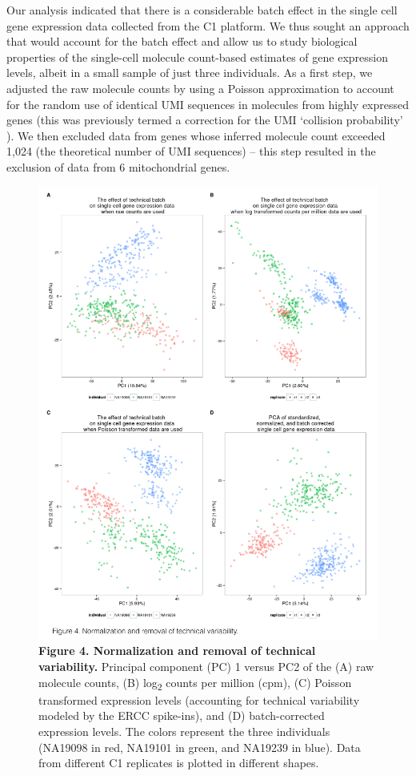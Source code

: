 Our analysis indicated that there is a considerable batch effect in the
single cell gene expression data collected from the C1 platform. We thus
sought an approach that would account for the batch effect and allow us
to study biological properties of the single-cell molecule count-based
estimates of gene expression levels, albeit in a small sample of just
three individuals. As a first step, we adjusted the raw molecule counts
by using a Poisson approximation to account for the random use of
identical UMI sequences in molecules from highly expressed genes (this
was previously termed a correction for the UMI `collision probability'
\citep{Fu2011}). We then excluded data from genes whose inferred molecule
count exceeded 1,024 (the theoretical number of UMI sequences) -- this
step resulted in the exclusion of data from 6 mitochondrial genes.

\begin{figure}[htbp]
\centering
\includegraphics[width=5in]{img/ch04/Figure04.jpeg}
\caption{\textbf{Figure 4. Normalization and removal of technical
variability.} Principal component (PC) 1 versus PC2 of the (A) raw
molecule counts, (B) log\textsubscript{2} counts per million (cpm), (C)
Poisson transformed expression levels (accounting for technical
variability modeled by the ERCC spike-ins), and (D) batch-corrected
expression levels. The colors represent the three individuals (NA19098
in red, NA19101 in green, and NA19239 in blue). Data from different C1
replicates is plotted in different shapes.}
\end{figure}

